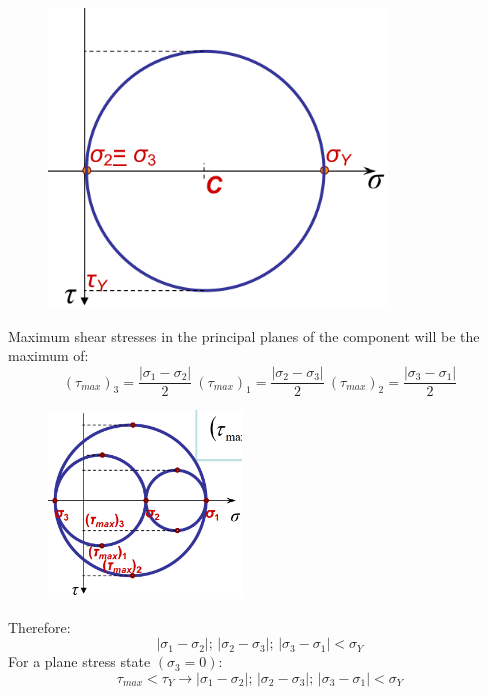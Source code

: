 \documentclass[class=report, crop=false, 12pt,a4paper]{standalone}
\begin{document}
\begin{figure}
\begin{center}
\begin{minipage}[b]{0.46\textwidth}
      \includegraphics[width = 0.8\textwidth]{../img/diagram23.png}
      \caption{}
    \end{minipage}
  \end{center}
\end{figure}
Maximum shear stresses in the principal planes of the component will be the maximum of:
\begin{equation}
  \left(\tau_{max}\right)_3 = \frac{\left| \sigma_1 - \sigma_2 \right| }{2} \ \left(\tau_{max}\right)_1 = \frac{\left| \sigma_2 - \sigma_3 \right| }{2} \ \left(\tau_{max}\right)_2 = \frac{\left| \sigma_3 - \sigma_1 \right| }{2} 
\end{equation}
\begin{figure}[H]
  \centering
  \includegraphics[height = 5cm]{../img/diagram24.png}
  \caption{}
\end{figure}
Therefore:
\begin{equation}
  \left| \sigma_1 - \sigma_2 \right| ; \, \left| \sigma_2 - \sigma_3 \right| ; \, \left| \sigma_3 - \sigma_1 \right| < \sigma_Y
\end{equation}
For a plane stress state $\left(\sigma_3 = 0\right)$:
\begin{equation}
  \tau_{max} < \tau_Y \rightarrow \left| \sigma_1 - \sigma_2 \right| ; \, \left| \sigma_2 - \sigma_3 \right| ; \, \left| \sigma_3 - \sigma_1 \right| < \sigma_Y
\end{equation}
\end{document}
